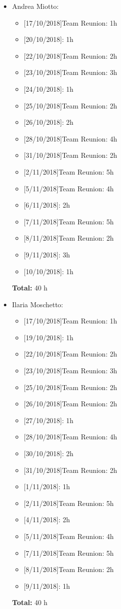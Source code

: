 \begin{itemize}
\item Andrea Miotto: 
\begin{itemize}
    \item {[}17/10/2018{]}Team Reunion: 1h
    \item {[}20/10/2018{]}: 1h
    \item {[}22/10/2018{]}Team Reunion: 2h
    \item {[}23/10/2018{]}Team Reunion: 3h
    \item {[}24/10/2018{]}: 1h
    \item {[}25/10/2018{]}Team Reunion: 2h
    \item {[}26/10/2018{]}: 2h
    \item {[}28/10/2018{]}Team Reunion: 4h
    \item {[}31/10/2018{]}Team Reunion: 2h
    \item {[}2/11/2018{]}Team Reunion:  5h
    \item {[}5/11/2018{]}Team Reunion:  4h
    \item {[}6/11/2018{]}: 2h
    \item {[}7/11/2018{]}Team Reunion: 5h
    \item {[}8/11/2018{]}Team Reunion: 2h
    \item {[}9/11/2018{]}: 3h
    \item {[}10/10/2018{]}: 1h
\end{itemize}
\textbf{Total:} 40 h

\item Ilaria Moschetto: 
\begin{itemize}
    \item {[}17/10/2018{]}Team Reunion: 1h
    \item {[}19/10/2018{]}: 1h
    \item {[}22/10/2018{]}Team Reunion: 2h
    \item {[}23/10/2018{]}Team Reunion: 3h
    \item {[}25/10/2018{]}Team Reunion: 2h
    \item {[}26/10/2018{]}Team Reunion: 2h
    \item {[}27/10/2018{]}: 1h
    \item {[}28/10/2018{]}Team Reunion: 4h
    \item {[}30/10/2018{]}: 2h
    \item {[}31/10/2018{]}Team Reunion: 2h
    \item {[}1/11/2018{]}: 1h
    \item {[}2/11/2018{]}Team Reunion: 5h
    \item {[}4/11/2018{]}: 2h
    \item {[}5/11/2018{]}Team Reunion:  4h
    \item {[}7/11/2018{]}Team Reunion:  5h
    \item {[}8/11/2018{]}Team Reunion: 2h
    \item {[}9/11/2018{]}: 1h
\end{itemize}

\textbf{Total:} 40 h
\end{itemize}